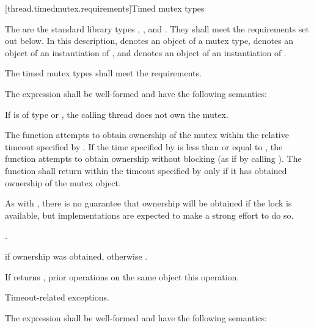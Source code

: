 [thread.timedmutex.requirements]{Timed mutex types}

\pnum
The  are the standard library types ,
, and . They shall
meet the requirements set out below.
In this description,  denotes an object of a mutex type,
 denotes an object of an
instantiation of , and  denotes an
object of an
instantiation of .

\pnum
The timed mutex types shall meet the 
requirements.

\pnum
The expression  shall be well-formed and have the
following semantics:

\begin{itemdescr}
\pnum
\requires If  is of type  or
, the calling thread does not
own the mutex.

\pnum
\effects
The function attempts to obtain ownership of the mutex within the
relative timeout
specified by . If the time specified by  is less than or
equal to , the function attempts to obtain ownership without blocking (as if by calling
). The function shall return within the timeout specified by
 only if it has obtained ownership of the mutex object.
\begin{note}
As
with , there is no guarantee that ownership will be obtained if the
lock is available, but implementations are expected to make a strong effort to do so.
\end{note}

\pnum
\returntype {}.

\pnum
\returns
{} if ownership was obtained, otherwise .

\pnum
\sync
If  returns , prior  operations
on the same object  this operation.

\pnum
\throws
Timeout-related exceptions.
\end{itemdescr}

\pnum
The expression  shall be well-formed and have the
following semantics:

